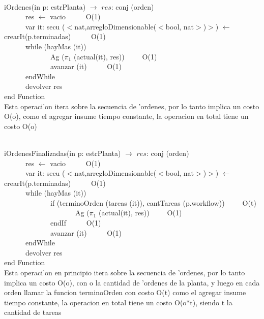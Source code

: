 \documentclass[a4paper,10pt]{article}
\begin{document}
\begin{algoritmo}
\caption{}\\
  iOrdenes(in p: estrPlanta) $\rightarrow$ $res$: conj (orden) \\
  \indent \ \ \ \ \ \  res $\gets$ vacio  \ \ \ \ \ O(1)\\
	\indent \ \ \ \ \ \  var it: secu ($<$nat,arregloDimensionable($<$bool, nat$>$)$>$) $\gets$ crearIt(p.terminadas)  \ \ \ \ \ O(1)\\
	\indent \ \ \ \ \ \  while (hayMas (it))  \ \ \ \ \ \\
	\indent \ \ \ \ \ \ \ \ \ \ \ \ \ Ag ($\pi_1$ (actual(it), res))\ \ \ \ \ O(1) \\
	\indent \ \ \ \ \ \ \ \ \ \ \ \ \ avanzar (it) \ \ \ \ \ O(1)\\
	\indent \ \ \ \ \ \ endWhile \ \ \ \ \ \\
   	\indent \ \ \ \ \ \ devolver res    \\
   end Function \\

Esta operaci'on itera sobre la secuencia de 'ordenes, por lo tanto implica un costo O(o),  como el agregar insume tiempo constante, la operacion en total tiene un costo O(o)

\end{algoritmo}

\begin{algoritmo}
\caption{}\\
  iOrdenesFinalizadas(in p: estrPlanta) $\rightarrow$ $res$: conj (orden) \\
	\indent \ \ \ \ \ \  res $\gets$ vacio  \ \ \ \ \ O(1)\\
	\indent \ \ \ \ \ \  var it: secu ($<$nat,arregloDimensionable($<$bool, nat$>$)$>$) $\gets$ crearIt(p.terminadas)  \ \ \ \ \ O(1)\\
	\indent \ \ \ \ \ \  while (hayMas (it))  \ \ \ \ \ \\
	\indent \ \ \ \ \ \ \ \ \ \ \ \ \ if (terminoOrden (tareas (it)), cantTareas (p.workflow))\ \ \ \ \ O(t) \\
	\indent \ \ \ \ \ \ \ \ \ \ \ \ \ \ \ \ \ \ \ \ Ag ($\pi_1$ (actual(it), res))\ \ \ \ \ O(1) \\
	\indent \ \ \ \ \ \ \ \ \ \ \ \ \ endIf \ \ \ \ \ O(1) \\
	\indent \ \ \ \ \ \ \ \ \ \ \ \ \ avanzar (it) \ \ \ \ \ O(1)\\
	\indent \ \ \ \ \ \ endWhile \ \ \ \ \ \\
   	\indent \ \ \ \ \ \ devolver res    \\
   end Function \\

Esta operaci'on en principio itera sobre la secuencia de 'ordenes, por lo tanto implica un costo O(o), con o la cantidad de 'ordenes de la planta, y luego en cada orden llamar la funcion terminoOrden con costo O(t) como el agregar insume tiempo constante, la operacion en total tiene un costo O(o$*$t), siendo t la cantidad de tareas
\end{algoritmo}
\end{document}
